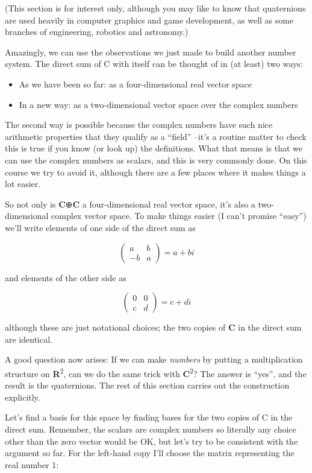 \documentclass[oneside,english]{amsbook}
\numberwithin{section}{chapter}
\theoremstyle{plain}
\theoremstyle{definition}
\begin{document}
(This section is for interest only, although you may like to know that
quaternions are used heavily in computer graphics and game development,
as well as some branches of engineering, robotics and astronomy.)

Amazingly, we can use the observations we just made to build another
number system. The direct sum of C with itself can be thought of in (at
least) two ways:

\begin{itemize}
	\item
	As we have been so far: as a four-dimensional real vector space
	\item
	In a new way: as a two-dimensional vector space over the complex
	numbers
\end{itemize}

The second way is possible because the complex numbers have such nice
arithmetic properties that they qualify as a ``field'' --it's a routine
matter to check this is true if you know (or look up) the definitions.
What that means is that we can use the complex numbers as scalars, and
this is very commonly done. On this course we try to avoid it, although
there are a few places where it makes things a lot easier.

So not only is \textbf{C}⊕\textbf{C} a four-dimensional real vector
space, it's also a two-dimensional complex vector space. To make things
easier (I can't promise ``easy'') we'll write elements of one side of
the direct sum as

\[\begin{pmatrix}
	a & b \\
	- b & a
\end{pmatrix} = a + bi\]

and elements of the other side as

\[\begin{pmatrix}
	0 & 0 \\
	c & d
\end{pmatrix} = c + di\]

although these are just notational choices; the two copies of \textbf{C}
in the direct sum are identical.

A good question now arises: If we can make \emph{numbers} by putting a
multiplication structure on \textbf{R}\textsuperscript{2}, can we do the
same trick with \textbf{C}\textsuperscript{2}? The answer is ``yes'',
and the result is the quaternions. The rest of this section carries out
the construction explicitly.

Let's find a basis for this space by finding bases for the two copies of
C in the direct sum. Remember, the scalars are complex numbers so
literally any choice other than the zero vector would be OK, but let's
try to be consistent with the argument so far. For the left-hand copy
I'll choose the matrix representing the real number 1:
\end{document}
